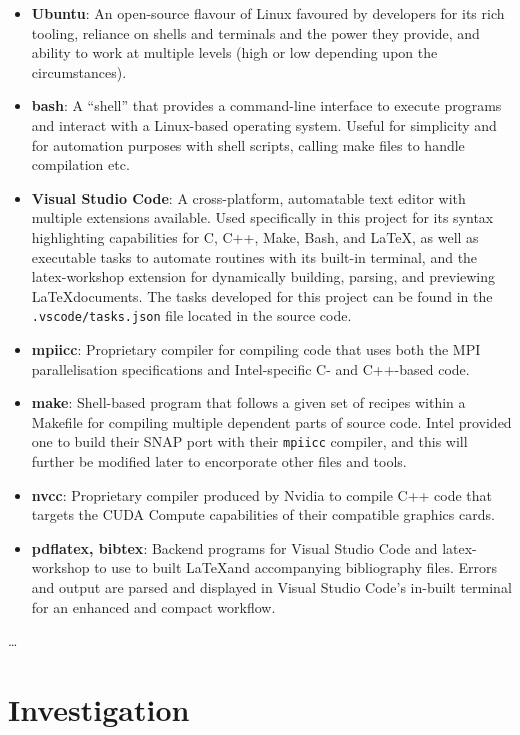 \documentclass[conference]{IEEEtran}
\begin{document}
\begin{itemize}
    \item \textbf{Ubuntu}: An open-source flavour of Linux favoured by developers for its rich tooling, reliance on shells and terminals and the power they provide, and ability to work at multiple levels (high or low depending upon the circumstances).
    \item \textbf{bash}: A ``shell'' that provides a command-line interface to execute programs and interact with a Linux-based operating system. Useful for simplicity and for automation purposes with shell scripts, calling make files to handle compilation etc.
    \item \textbf{Visual Studio Code}: A cross-platform, automatable text editor with multiple extensions available. Used specifically in this project for its syntax highlighting capabilities for C, C++, Make, Bash, and \LaTeX, as well as executable tasks to automate routines with its built-in terminal, and the latex-workshop extension for dynamically building, parsing, and previewing \LaTeX documents. The tasks developed for this project can be found in the \texttt{.vscode/tasks.json} file located in the source code.
    \item \textbf{mpiicc}: Proprietary compiler for compiling code that uses both the MPI parallelisation specifications and Intel-specific C- and C++-based code.
    \item \textbf{make}: Shell-based program that follows a given set of recipes within a Makefile for compiling multiple dependent parts of source code. Intel provided one to build their SNAP port with their \texttt{mpiicc} compiler, and this will further be modified later to encorporate other files and tools.
    \item \textbf{nvcc}: Proprietary compiler produced by Nvidia to compile C++ code that targets the CUDA Compute capabilities of their compatible graphics cards.
    \item \textbf{pdflatex, bibtex}: Backend programs for Visual Studio Code and latex-workshop to use to built \LaTeX and accompanying bibliography files. Errors and output are parsed and displayed in Visual Studio Code's in-built terminal for an enhanced and compact workflow.
\end{itemize}

\dots



\section{Investigation}\label{investigation}
\end{document}
